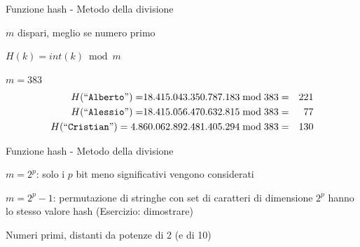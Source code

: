 \begin{frame}{Funzione hash - Metodo della divisione}

\vspace{-9pt}
\begin{myboxtitle}
\BIL
\item $m$ dispari, meglio se numero primo
\item $H(k) = \mathit{int}(k) \bmod m$
\EIL
\end{myboxtitle}

\begin{myboxtitle}[Esempio]
$m = 383$
\begin{align*}
H(``\texttt{Alberto}") =  &18.415.043.350.787.183 \bmod 383 =&  221 \\
H(``\texttt{Alessio}") =  &18.415.056.470.632.815  \bmod 383 =& 77 \\
H(``\texttt{Cristian}") = 4.8&60.062.892.481.405.294   \bmod 383 =& 130
\end{align*}

\end{myboxtitle}
   
\end{frame}


\begin{frame}{Funzione hash - Metodo della divisione}         

\vspace{-9pt}
\BIL
\item $m=2^p$: solo i $p$ bit meno significativi vengono considerati
\item $m=2^p-1$: permutazione di stringhe con set di caratteri di dimensione 
$2^p$ hanno lo stesso valore hash (Esercizio: dimostrare)
\EIL

\BIL
\item Numeri primi, distanti da potenze di 2 (e di 10)
\EIL

\end{frame}

